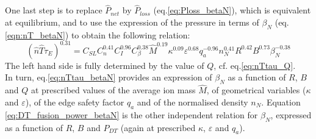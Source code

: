 One last step is to replace $\hat P_{net}$ by $\hat P_{loss}$ (eq.\ref{eq:Ploss_betaN}), which is equivalent at equilibrium, and to use the expression of the pressure in terms of $\beta_N$ (eq.\ref{eqn:nT_betaN}) to obtain the following relation:
\begin{equation}
  (\hat n\hat T\tau_E)^{0.31} = C_{SL} C_n^{0.41} C_I^{0.96} C_\beta^{0.38} 
    \hat M^{0.19} \kappa^{0.09} \varepsilon^{0.68} q_a^{-0.96}
    n_N^{0.41} R^{0.42} B^{0.73} \beta_N^{-0.38}
\label{eq:nTtau_betaN}
\end{equation}
The left hand side is fully determined by the value of $Q$, cf. eq.\ref{eq:nTtau_Q}. \\

In turn, eq.\ref{eq:nTtau_betaN} provides an expression of $\beta_N$ as a function of $R$, $B$ and $Q$ at prescribed values of the average ion mass $\hat M$, of geometrical variables ($\kappa$ and $\varepsilon$), of the edge safety factor $q_a$ and of the normalised density $n_N$.
Equation \ref{eq:DT_fusion_power_betaN} is the other independent relation for $\beta_N$, expressed as a function of $R$, $B$ and $P_{DT}$ (again at prescribed $\kappa$, $\varepsilon$ and $q_a$).



